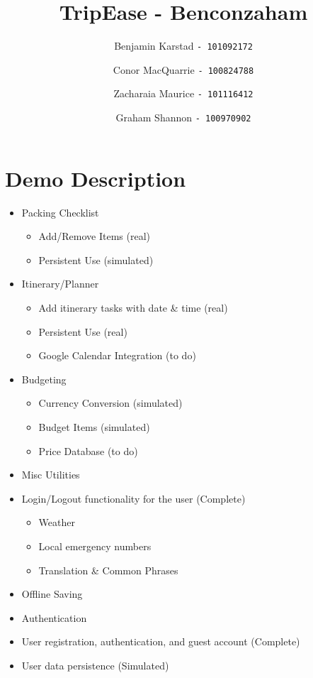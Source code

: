 \documentclass[12pt]{article}
\title{TripEase - Benconzaham}
\author{
Benjamin Karstad
\texttt{- 101092172}
\and
Conor MacQuarrie
\texttt{- 100824788}
\and
Zacharaia Maurice
\texttt{- 101116412}
\and
Graham Shannon
\texttt{- 100970902}
}
\begin{document}
	\maketitle

	\pagebreak

	\section*{Demo Description}

	\begin{itemize}

		\item{Packing Checklist}
		\begin{itemize}
			\item Add/Remove Items (real)
			\item Persistent Use (simulated)
		\end{itemize}

		\item{Itinerary/Planner}
		\begin{itemize}
			\item Add itinerary tasks with date \& time (real)
			\item Persistent Use (real)
			\item Google Calendar Integration (to do)
		\end{itemize}

		\item{Budgeting}
			\begin{itemize}
				\item Currency Conversion (simulated)
				\item Budget Items (simulated)
				\item Price Database (to do)
			\end{itemize}

		\item{Misc Utilities}
		    \item Login/Logout functionality for the user (Complete)

		\begin{itemize}
			\item Weather
			\item Local emergency numbers
			\item Translation \& Common Phrases
		\end{itemize}

		\item{Offline Saving}

		\item{Authentication}
		    \item User registration, authentication, and guest account (Complete)
		    \item User data persistence  (Simulated)

	\end{itemize}
	
\end{document}
